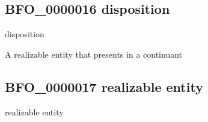 \documentclass[letterpaper,10pt,english]{sphinxmanual}
\begin{document}
\subsection{BFO\_0000016 \sphinxhyphen{} disposition}
\label{\detokenize{doc-BFO_0000016:bfo-0000016-disposition}}\label{\detokenize{doc-BFO_0000016:index-0}}\label{\detokenize{doc-BFO_0000016::doc}}
\begin{sphinxShadowBox}

\sphinxAtStartPar
disposition
\end{sphinxShadowBox}

\begin{sphinxShadowBox}

\sphinxAtStartPar
{\hyperref[\detokenize{doc-BFO_0000017::doc}]{}}
\end{sphinxShadowBox}

\begin{sphinxShadowBox}

\sphinxAtStartPar
A realizable entity that presents in a continuant
\end{sphinxShadowBox}

\begin{sphinxShadowBox}

\sphinxAtStartPar
{}
\end{sphinxShadowBox}
\begin{quote}

\ignorespaces \end{quote}


\subsection{BFO\_0000017 \sphinxhyphen{} realizable entity}
\label{\detokenize{doc-BFO_0000017:bfo-0000017-realizable-entity}}\label{\detokenize{doc-BFO_0000017:index-0}}\label{\detokenize{doc-BFO_0000017::doc}}
\begin{sphinxShadowBox}

\sphinxAtStartPar
realizable entity
\end{sphinxShadowBox}
\end{document}
